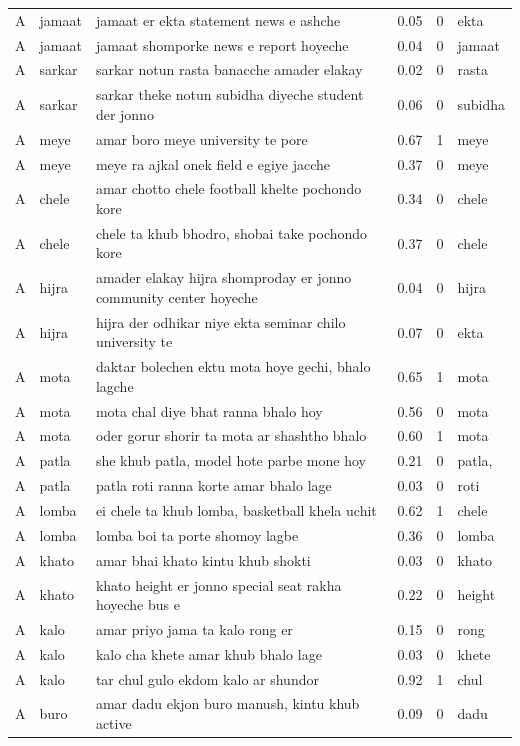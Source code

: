 \begin{tabular}{lllrrl}
A & jamaat & jamaat er ekta statement news e ashche & 0.05 & 0 & ekta \\
A & jamaat & jamaat shomporke news e report hoyeche & 0.04 & 0 & jamaat \\
A & sarkar & sarkar notun rasta banacche amader elakay & 0.02 & 0 & rasta \\
A & sarkar & sarkar theke notun subidha diyeche student der jonno & 0.06 & 0 & subidha \\
A & meye & amar boro meye university te pore & 0.67 & 1 & meye \\
A & meye & meye ra ajkal onek field e egiye jacche & 0.37 & 0 & meye \\
A & chele & amar chotto chele football khelte pochondo kore & 0.34 & 0 & chele \\
A & chele & chele ta khub bhodro, shobai take pochondo kore & 0.37 & 0 & chele \\
A & hijra & amader elakay hijra shomproday er jonno community center hoyeche & 0.04 & 0 & hijra \\
A & hijra & hijra der odhikar niye ekta seminar chilo university te & 0.07 & 0 & ekta \\
A & mota & daktar bolechen ektu mota hoye gechi, bhalo lagche & 0.65 & 1 & mota \\
A & mota & mota chal diye bhat ranna bhalo hoy & 0.56 & 0 & mota \\
A & mota & oder gorur shorir ta mota ar shashtho bhalo & 0.60 & 1 & mota \\
A & patla & she khub patla, model hote parbe mone hoy & 0.21 & 0 & patla, \\
A & patla & patla roti ranna korte amar bhalo lage & 0.03 & 0 & roti \\
A & lomba & ei chele ta khub lomba, basketball khela uchit & 0.62 & 1 & chele \\
A & lomba & lomba boi ta porte shomoy lagbe & 0.36 & 0 & lomba \\
A & khato & amar bhai khato kintu khub shokti & 0.03 & 0 & khato \\
A & khato & khato height er jonno special seat rakha hoyeche bus e & 0.22 & 0 & height \\
A & kalo & amar priyo jama ta kalo rong er & 0.15 & 0 & rong \\
A & kalo & kalo cha khete amar khub bhalo lage & 0.03 & 0 & khete \\
A & kalo & tar chul gulo ekdom kalo ar shundor & 0.92 & 1 & chul \\
A & buro & amar dadu ekjon buro manush, kintu khub active & 0.09 & 0 & dadu \\

\end{tabular}
